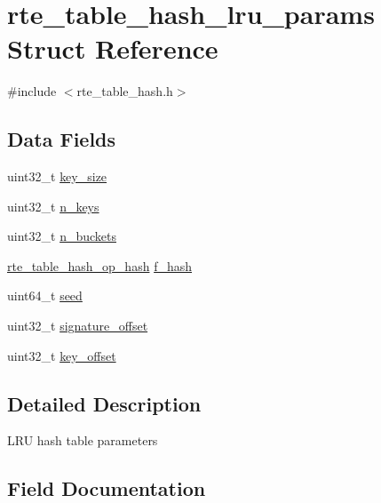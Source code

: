 \hypertarget{structrte__table__hash__lru__params}{}\section{rte\+\_\+table\+\_\+hash\+\_\+lru\+\_\+params Struct Reference}
\label{structrte__table__hash__lru__params}


{\ttfamily \#include $<$rte\+\_\+table\+\_\+hash.\+h$>$}

\subsection*{Data Fields}
\begin{DoxyCompactItemize}
\item 
uint32\+\_\+t \hyperlink{structrte__table__hash__lru__params_a83844a351f4b92ad62ba71b38733aa04}{key\+\_\+size}
\item 
uint32\+\_\+t \hyperlink{structrte__table__hash__lru__params_a4c48340399424293c79db3dc411e8231}{n\+\_\+keys}
\item 
uint32\+\_\+t \hyperlink{structrte__table__hash__lru__params_a241ccfe90f415a07cad8a881fc0f83ac}{n\+\_\+buckets}
\item 
\hyperlink{rte__table__hash_8h_a6633f20f58e850abc3d1650af5d900da}{rte\+\_\+table\+\_\+hash\+\_\+op\+\_\+hash} \hyperlink{structrte__table__hash__lru__params_a5a7373267cebe4384507b331c883624a}{f\+\_\+hash}
\item 
uint64\+\_\+t \hyperlink{structrte__table__hash__lru__params_a13dfa5fcb8e1184f1f7756e717fd2807}{seed}
\item 
uint32\+\_\+t \hyperlink{structrte__table__hash__lru__params_a255e199334632db5019afe0eb166a05a}{signature\+\_\+offset}
\item 
uint32\+\_\+t \hyperlink{structrte__table__hash__lru__params_aa09132fc271bc1be2e4032587665bcf7}{key\+\_\+offset}
\end{DoxyCompactItemize}


\subsection{Detailed Description}
L\+R\+U hash table parameters 

\subsection{Field Documentation}
\hypertarget{structrte__table__hash__lru__params_a5a7373267cebe4384507b331c883624a}{}
